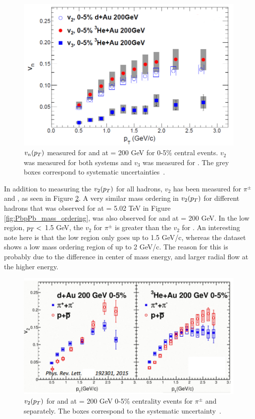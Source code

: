 \begin{figure}[h!]
\begin{center}
\includegraphics[width=0.75\linewidth]{figs/hedau_v2_v3.PNG}
\caption{ $v_n(\mbox{$p_T$})$ measured for \dau and \hau at \sqsn = 200 GeV for 0-5\% central events. $v_2$ was measured for both systems and $v_3$ was measured for \hau. The grey boxes correspond to systematic uncertainties~\cite{PhysRevLett.115.142301}.}
\label{fig:dhau_v2_v3}
\end{center}
\end{figure}

In addition to measuring the $v_2(\mbox{$p_T$})$ for all hadrons, $v_2$ has been measured for $\pi^{\pm}$ and \ppbar, as seen in Figure \ref{fig:dhau_mass_ordering}. A very similar mass ordering in $v_2(\mbox{$p_T$})$ for different hadrons that was observed for \ppb at \sqsn = 5.02 TeV  in Figure \ref{fig:PbpPb_mass_ordering}, was also observed for \dau and \hau at \sqsn =  200 GeV. In the low \pt region, $ \mbox{$p_T$} <$ 1.5 GeV, the $v_2$ for $\pi^{\pm}$ is greater than the $v_2$ for \ppbar. An interesting note here is that the low \pt region only goes up to 1.5 GeV/c, whereas the \ppb dataset shows a low \pt mass ordering region of up to 2 GeV/c. The reason for this is probably due to the difference in center of mass energy, and larger radial flow at the higher energy.

\begin{figure}[h!]
\begin{center}
\includegraphics[width=0.75\linewidth]{figs/dhau_mass_ordering_phenix.PNG}
\caption{ $v_2(\mbox{$p_T$})$ for \dau and \hau at \sqsn = 200 GeV 0-5\% centrality events for $\pi^{\pm}$ and \ppbar separately. The boxes correspond to the systematic uncertainty~\cite{PhysRevLett.115.142301}.}
\label{fig:dhau_mass_ordering}
\end{center}
\end{figure}

